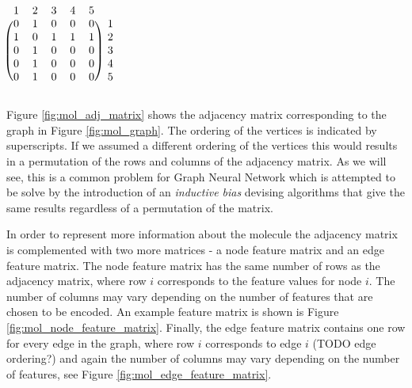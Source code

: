 \begin{minipage}{0.5\textwidth}
	\centering
	\label{fig:mol_graph}
\end{minipage}
\begin{minipage}{0.5\textwidth}
	\centering
	$
	\begin{blockarray}{cccccc}
	1 & 2 & 3 & 4 & 5 \\
	\begin{block}{(ccccc)c}
	0 & 1 & 0 & 0 & 0 & 1 \\
	1 & 0 & 1 & 1 & 1 & 2 \\
	0 & 1 & 0 & 0 & 0 & 3 \\
	0 & 1 & 0 & 0 & 0 & 4 \\
	0 & 1 & 0 & 0 & 0 & 5 \\
	\end{block}
	\end{blockarray}
	$
	\label{fig:mol_adj_matrix}
\end{minipage}
\newline\newline
Figure \ref{fig:mol_adj_matrix} shows the adjacency matrix corresponding to the graph in Figure \ref{fig:mol_graph}. The ordering of the vertices is indicated by superscripts. If we assumed a different ordering of the vertices this would results in a permutation of the rows and columns of the adjacency matrix. As we will see, this is a common problem for Graph Neural Network which is attempted to be solve by the introduction of an \emph{inductive bias} devising algorithms that give the same results regardless of a permutation of the matrix.

In order to represent more information about the molecule the adjacency matrix is complemented with two more matrices - a node feature matrix and an edge feature matrix. The node feature matrix has the same number of rows as the adjacency matrix, where row $i$ corresponds to the feature values for node $i$. The number of columns may vary depending on the number of features that are chosen to be encoded. An example feature matrix is shown is Figure \ref{fig:mol_node_feature_matrix}. Finally, the edge feature matrix contains one row for every edge in the graph, where row $i$ corresponds to edge $i$ (TODO edge ordering?) and again the number of columns may vary depending on the number of features, see Figure \ref{fig:mol_edge_feature_matrix}.

